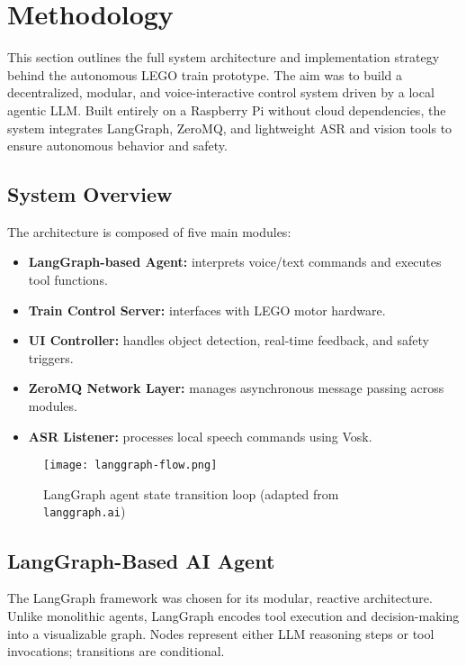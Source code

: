 \section{Methodology}
\label{sec:methodology}

This section outlines the full system architecture and implementation strategy behind the autonomous LEGO train prototype. The aim was to build a decentralized, modular, and voice-interactive control system driven by a local agentic LLM. Built entirely on a Raspberry Pi without cloud dependencies, the system integrates LangGraph, ZeroMQ, and lightweight ASR and vision tools to ensure autonomous behavior and safety.

\subsection{System Overview}

The architecture is composed of five main modules:

\begin{itemize}
    \item \textbf{LangGraph-based Agent:} interprets voice/text commands and executes tool functions.
    \item \textbf{Train Control Server:} interfaces with LEGO motor hardware.
    \item \textbf{UI Controller:} handles object detection, real-time feedback, and safety triggers.
    \item \textbf{ZeroMQ Network Layer:} manages asynchronous message passing across modules.
    \item \textbf{ASR Listener:} processes local speech commands using Vosk.
\end{itemize}

\begin{figure}[H]
    \centering
    \texttt{[image: langgraph-flow.png]}
    \caption{LangGraph agent state transition loop (adapted from \texttt{langgraph.ai})}
\end{figure}

\subsection{LangGraph-Based AI Agent}

The LangGraph framework was chosen for its modular, reactive architecture. Unlike monolithic agents, LangGraph encodes tool execution and decision-making into a visualizable graph. Nodes represent either LLM reasoning steps or tool invocations; transitions are conditional.

